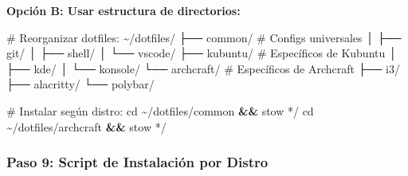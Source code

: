 \documentclass[
  doc,
  floatsintext,
  longtable,
  a4paper,
  nolmodern,
  notxfonts,
  notimes,
  12pt,
  colorlinks=true,linkcolor=blue,citecolor=blue,urlcolor=blue]{apa7}
\newenvironment{Shaded}{\begin{snugshade}}{\end{snugshade}}
\newcommand{\BuiltInTok}[1]{\textcolor[rgb]{0.00,0.23,0.31}{#1}}
\newcommand{\CommentTok}[1]{\textcolor[rgb]{0.37,0.37,0.37}{#1}}
\newcommand{\ExtensionTok}[1]{\textcolor[rgb]{0.00,0.23,0.31}{#1}}
\newcommand{\FunctionTok}[1]{\textcolor[rgb]{0.28,0.35,0.67}{#1}}
\newcommand{\KeywordTok}[1]{\textcolor[rgb]{0.00,0.23,0.31}{\textbf{#1}}}
\newcommand{\NormalTok}[1]{\textcolor[rgb]{0.00,0.23,0.31}{#1}}
\newcommand{\OperatorTok}[1]{\textcolor[rgb]{0.37,0.37,0.37}{#1}}
\newcommand{\PreprocessorTok}[1]{\textcolor[rgb]{0.68,0.00,0.00}{#1}}
\newcommand{\StringTok}[1]{\textcolor[rgb]{0.13,0.47,0.30}{#1}}
\begin{document}
\textbf{Opción B: Usar estructura de directorios:}

\begin{Shaded}
\begin{Highlighting}[]
\CommentTok{\# Reorganizar dotfiles:}
\ExtensionTok{\textasciitilde{}/dotfiles/}
\ExtensionTok{├──}\NormalTok{ common/          }\CommentTok{\# Configs universales}
\ExtensionTok{│}\NormalTok{   ├── git/}
\ExtensionTok{│}\NormalTok{   ├── shell/}
\ExtensionTok{│}\NormalTok{   └── vscode/}
\ExtensionTok{├──}\NormalTok{ kubuntu/         }\CommentTok{\# Específicos de Kubuntu}
\ExtensionTok{│}\NormalTok{   ├── kde/}
\ExtensionTok{│}\NormalTok{   └── konsole/}
\ExtensionTok{└──}\NormalTok{ archcraft/       }\CommentTok{\# Específicos de Archcraft}
    \ExtensionTok{├──}\NormalTok{ i3/}
    \ExtensionTok{├──}\NormalTok{ alacritty/}
    \ExtensionTok{└──}\NormalTok{ polybar/}

\CommentTok{\# Instalar según distro:}
\BuiltInTok{cd}\NormalTok{ \textasciitilde{}/dotfiles/common }\KeywordTok{\&\&} \ExtensionTok{stow} \PreprocessorTok{*}\NormalTok{/}
\BuiltInTok{cd}\NormalTok{ \textasciitilde{}/dotfiles/archcraft }\KeywordTok{\&\&} \ExtensionTok{stow} \PreprocessorTok{*}\NormalTok{/}
\end{Highlighting}
\end{Shaded}

\subsubsection{Paso 9: Script de Instalación por
Distro}\label{paso-9-script-de-instalaciuxf3n-por-distro}

\begin{Shaded}
\end{Shaded}
\end{document}
